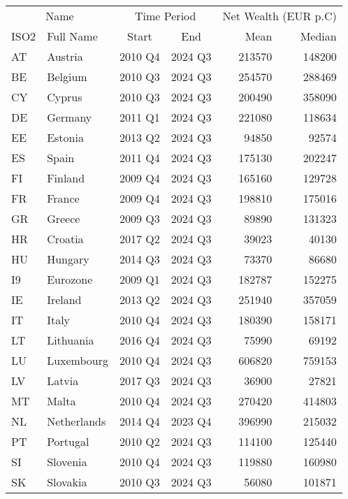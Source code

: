 \begin{table}[t]
\fontsize{12.0pt}{14.4pt}\selectfont
\begin{tabular*}{\linewidth}{@{\extracolsep{\fill}}llccrr}
\toprule
\multicolumn{2}{c}{Name} & \multicolumn{2}{c}{Time Period} & \multicolumn{2}{c}{Net Wealth (EUR p.C)} \\ 
\cmidrule(lr){1-2} \cmidrule(lr){3-4} \cmidrule(lr){5-6}
ISO2 & Full Name & Start & End & Mean & Median \\ 
\midrule\addlinespace[2.5pt]
AT & Austria & 2010 Q4 & 2024 Q3 & 213570 & 148200 \\ 
BE & Belgium & 2010 Q3 & 2024 Q3 & 254570 & 288469 \\ 
CY & Cyprus & 2010 Q3 & 2024 Q3 & 200490 & 358090 \\ 
DE & Germany & 2011 Q1 & 2024 Q3 & 221080 & 118634 \\ 
EE & Estonia & 2013 Q2 & 2024 Q3 & 94850 & 92574 \\ 
ES & Spain & 2011 Q4 & 2024 Q3 & 175130 & 202247 \\ 
FI & Finland & 2009 Q4 & 2024 Q3 & 165160 & 129728 \\ 
FR & France & 2009 Q4 & 2024 Q3 & 198810 & 175016 \\ 
GR & Greece & 2009 Q3 & 2024 Q3 & 89890 & 131323 \\ 
HR & Croatia & 2017 Q2 & 2024 Q3 & 39023 & 40130 \\ 
HU & Hungary & 2014 Q3 & 2024 Q3 & 73370 & 86680 \\ 
I9 & Eurozone & 2009 Q1 & 2024 Q3 & 182787 & 152275 \\ 
IE & Ireland & 2013 Q2 & 2024 Q3 & 251940 & 357059 \\ 
IT & Italy & 2010 Q4 & 2024 Q3 & 180390 & 158171 \\ 
LT & Lithuania & 2016 Q4 & 2024 Q3 & 75990 & 69192 \\ 
LU & Luxembourg & 2010 Q4 & 2024 Q3 & 606820 & 759153 \\ 
LV & Latvia & 2017 Q3 & 2024 Q3 & 36900 & 27821 \\ 
MT & Malta & 2010 Q4 & 2024 Q3 & 270420 & 414803 \\ 
NL & Netherlands & 2014 Q4 & 2023 Q4 & 396990 & 215032 \\ 
PT & Portugal & 2010 Q2 & 2024 Q3 & 114100 & 125440 \\ 
SI & Slovenia & 2010 Q4 & 2024 Q3 & 119880 & 160980 \\ 
SK & Slovakia & 2010 Q3 & 2024 Q3 & 56080 & 101871 \\ 
\bottomrule
\end{tabular*}
\end{table}


